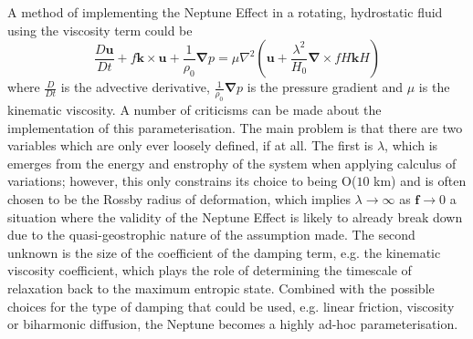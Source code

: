 \documentclass[12pt,a4paper]{report}
\begin{document}
                	A method of implementing the Neptune Effect in a rotating, hydrostatic fluid using the viscosity term could be
                	\begin{equation}
                	\frac{D \boldsymbol{u}}{Dt}
                		+f\boldsymbol{k}\times\boldsymbol{u}+
                		\frac{1}{\rho_{0}}\boldsymbol{\nabla}p
                		 = \mu \nabla^{2}\left(\boldsymbol{u}
                		+\frac{\lambda^{2}}{H_{0}}
                		\boldsymbol{\nabla}\times fH\boldsymbol{k}H\right)
                	\end{equation}
                	where $\frac{D }{Dt}$ is the advective derivative, 
                	$\frac{1}{\rho_{0}}\boldsymbol{\nabla}p$ is the pressure gradient and
                	$\mu $ is the kinematic viscosity.
                	 A number of criticisms can be made about the implementation of this
                	  parameterisation. The main problem is that there are two variables
                	   which are only ever loosely defined, if at all. The first is
                	    $\lambda$, which is emerges from the energy and enstrophy of the
                	     system when applying calculus of variations; however, this only
                	      constrains its choice to being  O($10$ km) and is often chosen to
                	       be the Rossby radius of deformation, which implies $\lambda
                	        \rightarrow \infty$ as  $\boldsymbol{f} \rightarrow 0$   a
                	         situation where the validity of the Neptune Effect is likely to already break down due to the quasi-geostrophic nature of
                	          the assumption made. The second unknown is the size of the
                	           coefficient of the damping term, e.g. the kinematic
                	            viscosity coefficient, which plays the role of determining
                	             the timescale of relaxation back to the maximum entropic
                	              state. Combined with the possible choices for the type of
                	               damping that could be used, e.g. linear friction,
                	                viscosity or biharmonic diffusion, the Neptune becomes
                	                 a highly ad-hoc parameterisation. 
                	 
\end{document}
